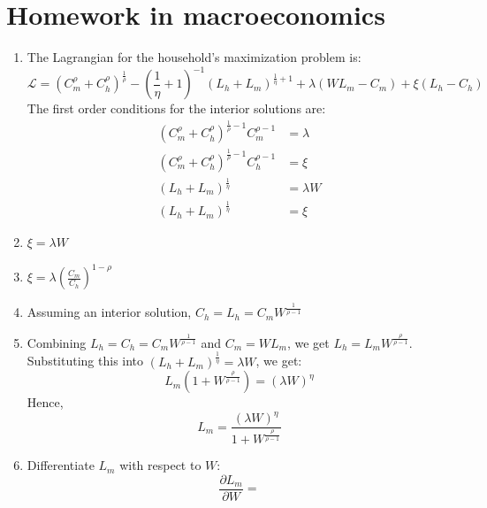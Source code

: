\documentclass[11pt]{amsart}
\begin{document}
\section{Homework in macroeconomics}
\begin{enumerate}[label = (\alph*)]
	\item The Lagrangian for the household's maximization problem is:
	\begin{equation*}
	\mathcal{L} = \left( C_m^\rho + C_h^\rho \right)^{\frac{1}{\rho}} - \left( \frac{1}{\eta} + 1 \right)^{-1} \left(  L_h + L_m \right)^{\frac{1}{\eta} + 1} + \lambda \left( W L_m - C_m \right) + \xi \left(L_h - C_h \right)
	\end{equation*}
	The first order conditions for the interior solutions are:
	\begin{align*}
	\left( C_m^\rho + C_h^\rho \right)^{\frac{1}{\rho} -1} C_m^{\rho-1} &= \lambda \\
	\left( C_m^\rho + C_h^\rho \right)^{\frac{1}{\rho} -1} C_h^{\rho-1} & = \xi \\
	\left(  L_h + L_m \right)^{\frac{1}{\eta} }  &=\lambda W \\
	\left(  L_h + L_m \right)^{\frac{1}{\eta} }  &= \xi 	 
	\end{align*}
	\item $\xi = \lambda W $
	\item $\xi = \lambda \left( \frac{C_m}{C_h} \right)^{1-\rho}$ \\
	\item Assuming an interior solution, $C_h = L_h = C_m W^{\frac{1}{\rho-1}}$
	\item Combining $L_h = C_h = C_m W^{\frac{1}{\rho-1}}$ and $C_m = W L_m$, we get $L_h = L_m W^{\frac{\rho}{\rho-1}}$. Substituting this into $\left(  L_h + L_m \right)^{\frac{1}{\eta} }  =\lambda W$, we get:
	\begin{equation*}
	L_m \left( 1 + W^{\frac{\rho}{\rho-1}} \right) = \left( \lambda W \right)^\eta
	\end{equation*}
	Hence, 
	\begin{equation*}
	L_m = \frac{(\lambda W)^\eta}{1 + W^{\frac{\rho}{\rho-1}}}
	\end{equation*}
	
	\item Differentiate $L_m$ with respect to $W$:
	\begin{equation*}
	\frac{\partial L_m}{\partial W} = 
	\end{equation*}

\end{enumerate}
\end{document}

